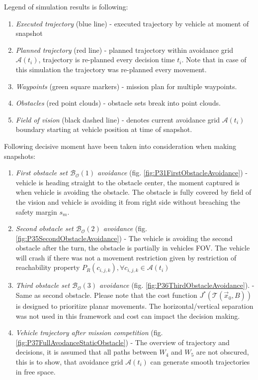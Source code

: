 \noindent Legend of simulation results is following:
\begin{enumerate}
    \item\emph{Executed trajectory} (blue line) - executed trajectory by vehicle at moment of snapshot
    \item\emph{Planned trajectory} (red line) - planned trajectory within avoidance grid $\mathscr{A}(t_i)$, trajectory is re-planned every decision time $t_i$. Note that in case of this simulation the trajectory was re-planned every movement.
    \item\emph{Waypoints} (green square markers) - mission plan for multiple waypoints. 
    \item\emph{Obstacles} (red point clouds) - obstacle sets break into point clouds.
    \item\emph{Field of vision} (black dashed line) - denotes current avoidance grid $\mathscr{A}(t_i)$ boundary starting at vehicle position at time of snapshot.
\end{enumerate}
    
\noindent Following decisive moment have been taken into consideration when making snapshots:
\begin{enumerate}
    \item\emph{First obstacle set $\mathscr{B}_\mathscr{O}(1)$ avoidance} (fig. \ref{fig:P31FirstObstacleAvoidance}) - vehicle is heading straight to the obstacle center, the moment captured is when vehicle is avoiding the obstacle. The obstacle is fully covered by field of the vision and vehicle is avoiding it from right side without breaching the safety margin $s_m$. 
    \item\emph{Second obstacle set $\mathscr{B}_\mathscr{O}(2)$ avoidance} (fig. \ref{fig:P35SecondObstacleAvoidance}) - The vehicle is avoiding the second obstacle after the turn, the obstacle is partially in vehicles FOV. The vehicle will crash if there was not a movement restriction given by restriction of reachability property $P_{R}(c_{i,j,k}), \forall c_{i,j,k}\in\mathscr{A}(t_i)$
    \item\emph{Third obstacle set $\mathscr{B}_\mathscr{O}(3)$ avoidance} (fig. \ref{fig:P36ThirdObstacleAvoidance}). - Same as second obstacle. Please note that the cost function $J^*(\mathscr{T}(\vec{x}_0,B))$ is designed to prioritize planar movements. The horizontal/vertical separation was not used in this framework and cost can impact the decision making. 
    \item\emph{Vehicle trajectory after mission competition} (fig. \ref{fig:P37FullAvodanceStaticObstacle}) - The overview of trajectory and decisions, it is assumed that all paths between $W_4$ and $W_5$ are not obscured, this is to show, that avoidance grid $\mathscr{A}(t_i)$ can generate smooth trajectories in free space.
\end{enumerate}

